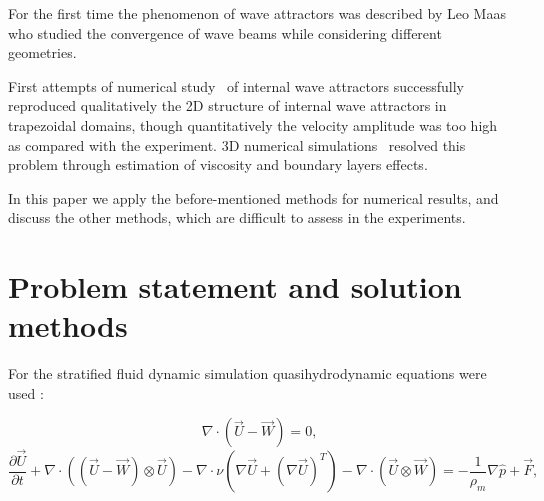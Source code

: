 \documentclass[a4wide,fontsize=12pt]{article}
\begin{document}

For the first time the phenomenon of wave attractors was described by Leo Maas \cite{Maas1995} who studied the convergence of wave beams while considering different geometries.

First attempts of numerical study~\cite{2008GrisouardStaquetPairaud} of internal wave attractors successfully reproduced qualitatively the 2D structure of internal wave attractors in trapezoidal domains, though quantitatively the velocity amplitude was too high  as compared with the experiment. 3D numerical simulations~\cite{2016BrouzetSibgatullinScolanErmanyukDauxois,2016BrouzetErmanyukJoubaudSibgatullinDauxois} resolved this problem through estimation of viscosity and boundary layers effects.

In this paper we apply the before-mentioned methods for numerical results, and discuss the other methods, which are difficult to assess in the experiments.

\section{Problem statement and solution methods}

For the stratified fluid dynamic simulation quasihydrodynamic equations were used \cite{ElizarBook}: 

 \begin{equation}
     \nabla \cdot \left (\vec U - \vec W \right ) = 0,
     \label{eq:cont}
 \end{equation}
 \begin{equation}
     \frac{\partial \vec U}{\partial t}  + \nabla \cdot \left ( (\vec U - \vec W)\otimes \vec U  \right )
     -
     \nabla \cdot \nu \left ( \nabla \vec U + (\nabla \vec U)^T \right ) - \nabla \cdot \left  (   \vec U \otimes \vec W \right ) 
      = - \frac{1}{\rho_m} \nabla \hat p + \vec F,
      \label{eq:mom}
 \end{equation}
     
\end{document}
